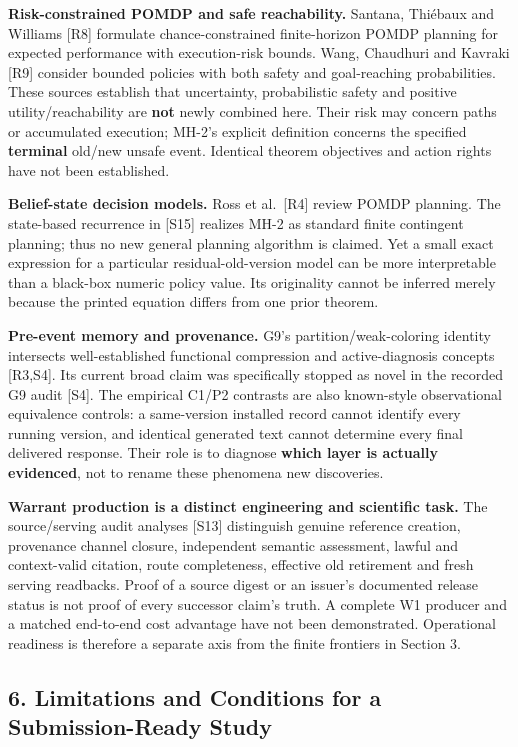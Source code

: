 \documentclass[
  10pt,
  american,
  a4paper,
]{article}
\begin{document}
\textbf{Risk-constrained POMDP and safe reachability.} Santana, Thiébaux
and Williams {[}R8{]} formulate chance-constrained finite-horizon POMDP
planning for expected performance with execution-risk bounds. Wang,
Chaudhuri and Kavraki {[}R9{]} consider bounded policies with both
safety and goal-reaching probabilities. These sources establish that
uncertainty, probabilistic safety and positive utility/reachability are
\textbf{not} newly combined here. Their risk may concern paths or
accumulated execution; MH-2's explicit definition concerns the specified
\textbf{terminal} old/new unsafe event. Identical theorem objectives and
action rights have not been established.

\textbf{Belief-state decision models.} Ross et al.~{[}R4{]} review POMDP
planning. The state-based recurrence in {[}S15{]} realizes MH-2 as
standard finite contingent planning; thus no new general planning
algorithm is claimed. Yet a small exact expression for a particular
residual-old-version model can be more interpretable than a black-box
numeric policy value. Its originality cannot be inferred merely because
the printed equation differs from one prior theorem.

\textbf{Pre-event memory and provenance.} G9's partition/weak-coloring
identity intersects well-established functional compression and
active-diagnosis concepts {[}R3,S4{]}. Its current broad claim was
specifically stopped as novel in the recorded G9 audit {[}S4{]}. The
empirical C1/P2 contrasts are also known-style observational equivalence
controls: a same-version installed record cannot identify every running
version, and identical generated text cannot determine every final
delivered response. Their role is to diagnose \textbf{which layer is
actually evidenced}, not to rename these phenomena new discoveries.

\textbf{Warrant production is a distinct engineering and scientific
task.} The source/serving audit analyses {[}S13{]} distinguish genuine
reference creation, provenance channel closure, independent semantic
assessment, lawful and context-valid citation, route completeness,
effective old retirement and fresh serving readbacks. Proof of a source
digest or an issuer's documented release status is not proof of every
successor claim's truth. A complete W1 producer and a matched end-to-end
cost advantage have not been demonstrated. Operational readiness is
therefore a separate axis from the finite frontiers in Section 3.

\hypertarget{limitations-and-conditions-for-a-submission-ready-study}{%
\subsection{6. Limitations and Conditions for a Submission-Ready
Study}\label{limitations-and-conditions-for-a-submission-ready-study}}
\end{document}
